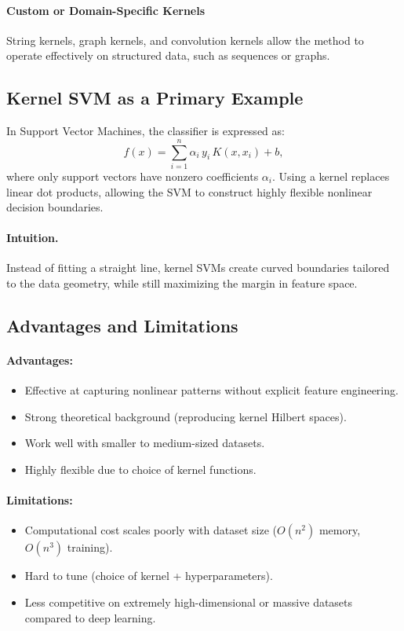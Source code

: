 \documentclass[12pt,a4paper]{report}
\begin{document}
\paragraph{Custom or Domain-Specific Kernels}
String kernels, graph kernels, and convolution kernels allow the method to operate effectively on structured data, such as sequences or graphs.

\vspace{1em}
\subsection{Kernel SVM as a Primary Example}

In Support Vector Machines, the classifier is expressed as:
\[
f(x) = \sum_{i=1}^n \alpha_i \, y_i \, K(x, x_i) + b,
\]
where only support vectors have nonzero coefficients $\alpha_i$.  
Using a kernel replaces linear dot products, allowing the SVM to construct highly flexible nonlinear decision boundaries.

\paragraph{Intuition.}  
Instead of fitting a straight line, kernel SVMs create curved boundaries tailored to the data geometry, while still maximizing the margin in feature space.

\vspace{1em}
\subsection{Advantages and Limitations}

\paragraph{Advantages:}
\begin{itemize}
    \item Effective at capturing nonlinear patterns without explicit feature engineering.
    \item Strong theoretical background (reproducing kernel Hilbert spaces).
    \item Work well with smaller to medium-sized datasets.
    \item Highly flexible due to choice of kernel functions.
\end{itemize}

\paragraph{Limitations:}
\begin{itemize}
    \item Computational cost scales poorly with dataset size ($O(n^2)$ memory, $O(n^3)$ training).
    \item Hard to tune (choice of kernel + hyperparameters).
    \item Less competitive on extremely high-dimensional or massive datasets compared to deep learning.
\end{itemize}
\end{document}
